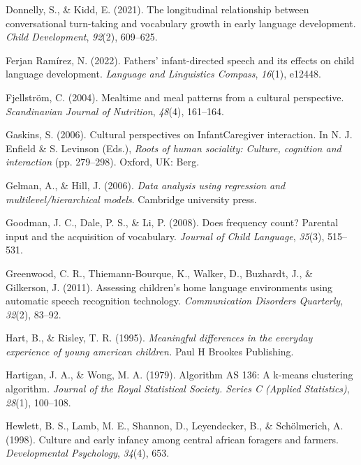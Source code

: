 \documentclass[
  man,floatsintext]{apa6}
\newlength{\cslhangindent}
\newlength{\cslentryspacingunit} %
\newenvironment{CSLReferences}[2] %
 {%
  \setlength{\parindent}{0pt}
  \ifodd #1
  \let\oldpar\par
  \def\par{\hangindent=\cslhangindent\oldpar}
  \fi
  \setlength{\parskip}{#2\cslentryspacingunit}
 }%
 {}
\begin{document}
\begin{CSLReferences}{1}{0}
\leavevmode{}%
Donnelly, S., \& Kidd, E. (2021). The longitudinal relationship between conversational turn-taking and vocabulary growth in early language development. \emph{Child Development}, \emph{92}(2), 609--625.

\leavevmode{}%
Ferjan Ramírez, N. (2022). Fathers' infant-directed speech and its effects on child language development. \emph{Language and Linguistics Compass}, \emph{16}(1), e12448.

\leavevmode{}%
Fjellström, C. (2004). Mealtime and meal patterns from a cultural perspective. \emph{Scandinavian Journal of Nutrition}, \emph{48}(4), 161--164.

\leavevmode{}%
Gaskins, S. (2006). Cultural perspectives on InfantCaregiver interaction. In N. J. Enfield \& S. Levinson (Eds.), \emph{Roots of human sociality: Culture, cognition and interaction} (pp. 279--298). Oxford, UK: Berg.

\leavevmode{}%
Gelman, A., \& Hill, J. (2006). \emph{Data analysis using regression and multilevel/hierarchical models}. Cambridge university press.

\leavevmode{}%
Goodman, J. C., Dale, P. S., \& Li, P. (2008). Does frequency count? Parental input and the acquisition of vocabulary. \emph{Journal of Child Language}, \emph{35}(3), 515--531.

\leavevmode{}%
Greenwood, C. R., Thiemann-Bourque, K., Walker, D., Buzhardt, J., \& Gilkerson, J. (2011). Assessing children's home language environments using automatic speech recognition technology. \emph{Communication Disorders Quarterly}, \emph{32}(2), 83--92.

\leavevmode{}%
Hart, B., \& Risley, T. R. (1995). \emph{Meaningful differences in the everyday experience of young american children.} Paul H Brookes Publishing.

\leavevmode{}%
Hartigan, J. A., \& Wong, M. A. (1979). Algorithm AS 136: A k-means clustering algorithm. \emph{Journal of the Royal Statistical Society. Series C (Applied Statistics)}, \emph{28}(1), 100--108.

\leavevmode{}%
Hewlett, B. S., Lamb, M. E., Shannon, D., Leyendecker, B., \& Schölmerich, A. (1998). Culture and early infancy among central african foragers and farmers. \emph{Developmental Psychology}, \emph{34}(4), 653.


\end{CSLReferences}
\end{document}
